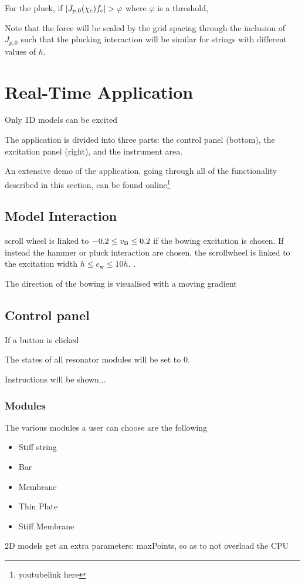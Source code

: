 \documentclass{article}
\begin{document}
For the pluck, if $|J_{p, 0}(\chi_{\text{e}}) f_{\text{e}}| > \varphi$ where $\varphi$ is a threshold, 

Note that the force will be scaled by the grid spacing through the inclusion of $J_{p, 0}$ such that the plucking interaction will be similar for strings with different values of $h$. 

\section{Real-Time Application}
Only 1D models can be excited

The application is divided into three parts: the control panel (bottom), the excitation panel (right), and the instrument area. 

An extensive demo of the application, going through all of the functionality described in this section, can be found online\footnote{youtubelink here}

\subsection{Model Interaction}
scroll wheel is linked to $-0.2 \leq v_{\text{B}} \leq 0.2$ if the bowing excitation is chosen. If instead the hammer or pluck interaction are chosen, the scrollwheel is linked to the excitation width $h \leq e_\text{w} \leq 10 h$. . 

The direction of the bowing is visualised with a moving gradient 
\subsection{Control panel}
If a button is clicked

The states of all resonator modules will be set to 0.

Instructions will be shown... 
\subsubsection{Modules}
The various modules a user can choose are the following
\begin{itemize}
    \item Stiff string
    \item Bar
    \item Membrane
    \item Thin Plate
    \item Stiff Membrane
\end{itemize}

2D models get an extra parameters: maxPoints, so as to not overload the CPU 
\end{document}
